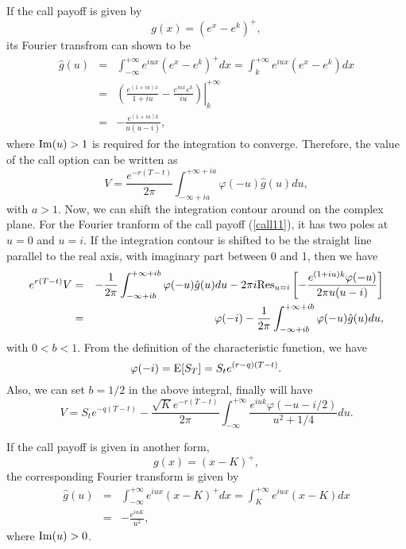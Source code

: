 \documentclass[12pt]{article}
\begin{document}
    If the call payoff is given by
    \begin{equation}
      g(x)=\left(e^x-e^k\right)^+,
    \end{equation}
    its Fourier transfrom can shown to be
    \begin{eqnarray}
      \hat{g}(u) &=& \int_{-\infty}^{+\infty}e^{iux}\left(e^x-e^k\right)^+dx=\int_{k}^{+\infty}e^{iux}\left(e^x-e^k\right)dx \nonumber\\
                 &=& \left.\left(\frac{e^{(1+iu)x}}{1+iu}-\frac{e^{iux}e^k}{iu}\right)\right|_k^{+\infty}\nonumber\\
                 &=& -\frac{e^{(1+iu)k}}{u(u-i)},
      \label{call11}
    \end{eqnarray}
    where ${\rm Im}(u) > 1$ is required for the integration to converge. Therefore, the value of the call option can be written as
    \begin{equation}
      V = \frac{e^{-r(T-t)}}{2\pi}\int_{-\infty+ia}^{+\infty+ia}\varphi(-u)\hat{g}(u)du,
    \end{equation}
    with $a>1$. Now, we can shift the integration contour around on the complex plane. For the Fourier tranform of the call payoff (\ref{call11}),
    it has two poles at $u=0$ and $u=i$. If the integration contour is shifted to be the straight line parallel to the real axis, with imaginary
    part between 0 and 1, then we have
    \begin{eqnarray}
      e^{r(T-t)}V &=& -\frac{1}{2\pi}\int_{-\infty+ib}^{+\infty+ib}\varphi(-u)\hat{g}(u)du - 2\pi i {\rm Res}_{u=i}\left[-\frac{e^{(1+iu)k}\varphi(-u)}{2\pi u(u-i)}\right] \nonumber\\
        &=& \varphi(-i) - \frac{1}{2\pi}\int_{-\infty+ib}^{+\infty+ib}\varphi(-u)\hat{g}(u)du,
    \end{eqnarray}
    with $0<b<1$. From the definition of the characteristic function, we have
    \begin{equation}
      \varphi(-i) = {\rm E}[S_T]=S_te^{(r-q)(T-t)}.
    \end{equation}
    Also, we can set $b=1/2$ in the above integral, finally will have
    \begin{equation}
      V = S_te^{-q(T-t)} - \frac{\sqrt{K}e^{-r(T-t)}}{2\pi}\int_{-\infty}^{+\infty}\frac{e^{iuk}\varphi\left(-u-i/2\right)}{u^2+1/4}du.
      \label{call12}
    \end{equation}


    If the call payoff is given in another form,
    \begin{equation}
      g(x)=\left(x-K\right)^+,
    \end{equation}
    the corresponding Fourier transform is given by
    \begin{eqnarray}
      \hat{g}(u) &=& \int_{-\infty}^{+\infty}e^{iux}\left(x-K\right)^+dx=\int_{K}^{+\infty}e^{iux}\left(x-K\right)dx \nonumber\\
                 &=& -\frac{e^{iuK}}{u^2},
    \end{eqnarray}
    where ${\rm Im}(u) > 0$.
\end{document}

